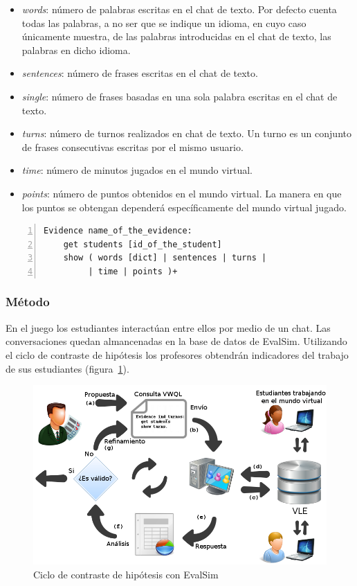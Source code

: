 \begin{itemize}
\item \emph{words}: número de palabras escritas en el chat de texto. Por defecto cuenta todas las palabras, a no ser que se indique un idioma, en cuyo caso únicamente muestra, de las palabras introducidas en el chat de texto, las palabras en dicho idioma.
\item \emph{sentences}: número de frases escritas en el chat de texto.
\item \emph{single}: número de frases basadas en una sola palabra escritas en el chat de texto.
\item \emph{turns}: número de turnos realizados en chat de texto. Un turno es un conjunto de frases consecutivas escritas por el mismo usuario.
\item \emph{time}: número de minutos jugados en el mundo virtual.
\item \emph{points}: número de puntos obtenidos en el mundo virtual. La manera en que los puntos se obtengan dependerá específicamente del mundo virtual jugado.
\end{itemize}

\begin{lstlisting}[caption=Palabras reservadas y formato de VWQL (version 0.1), label=code:reserved,numbers=left, captionpos=b, morekeywords={Evidence,get, students, show, words, sentences, turns, time, points}]
Evidence name_of_the_evidence:
    get students [id_of_the_student]
    show ( words [dict] | sentences | turns |
         | time | points )+
\end{lstlisting}

\subsubsection{Método}

En el juego los estudiantes interactúan entre ellos por medio de un chat. Las conversaciones quedan almancenadas en la base de datos de EvalSim. Utilizando el ciclo de contraste de hipótesis los profesores obtendrán indicadores del trabajo de sus estudiantes (figura~\ref{fig:EvsDiagram}).

\begin{figure}
  \begin{center}
    \includegraphics[scale=0.4]{EvsDiagram.png}
  \end{center}
  \caption{Ciclo de contraste de hipótesis con EvalSim}
  \label{fig:EvsDiagram}
\end{figure}


